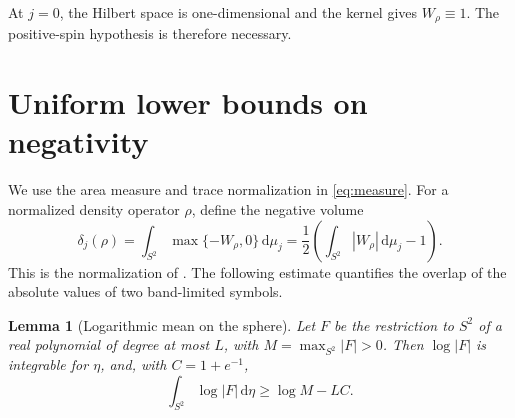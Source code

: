 \documentclass[11pt,a4paper]{article}
\newtheorem{lemma}{Lemma}
\newcommand{\dd}{\,\mathrm{d}}
\begin{document}
At \(j=0\), the Hilbert space is one-dimensional and the kernel gives
\(W_\rho\equiv 1\). The positive-spin hypothesis is therefore necessary.

\section{Uniform lower bounds on negativity}

We use the area measure and trace normalization in \eqref{eq:measure}.
For a normalized density operator \(\rho\), define the negative volume
\begin{equation}
  \delta_j(\rho)
  =\int_{S^2}\max\{-W_\rho,0\}\dd\mu_j
  =\frac12\left(\int_{S^2}|W_\rho|\dd\mu_j-1\right).
  \label{eq:negative-volume}
\end{equation}
This is the normalization of \cite[Eq.~(14)]{davis2021}.
The following estimate quantifies the overlap of the absolute values
of two band-limited symbols.

\begin{lemma}[Logarithmic mean on the sphere]\label{lem:log}
Let \(F\) be the restriction to \(S^2\) of a real polynomial of
degree at most \(L\), with \(M=\max_{S^2}|F|>0\). Then
\(\log|F|\) is integrable for \(\eta\), and, with \(C=1+e^{-1}\),
\begin{equation}
  \int_{S^2}\log|F|\dd\eta\geq \log M-LC .
  \label{eq:logmean}
\end{equation}
\end{lemma}
\end{document}
